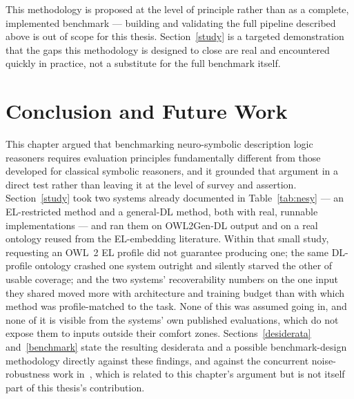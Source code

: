 This methodology is proposed at the level of principle rather than as a complete, implemented benchmark — building and validating the full pipeline described above is out of scope for this thesis. Section~\ref{study} is a targeted demonstration that the gaps this methodology is designed to close are real and encountered quickly in practice, not a substitute for the full benchmark itself.

\section{Conclusion and Future Work}
\label{conclusion}

This chapter argued that benchmarking neuro-symbolic description logic reasoners requires evaluation principles fundamentally different from those developed for classical symbolic reasoners, and it grounded that argument in a direct test rather than leaving it at the level of survey and assertion. Section~\ref{study} took two systems already documented in Table~\ref{tab:nesy} — an EL-restricted method and a general-DL method, both with real, runnable implementations — and ran them on OWL2Gen-DL output and on a real ontology reused from the EL-embedding literature. Within that small study, requesting an OWL~2 EL profile did not guarantee producing one; the same DL-profile ontology crashed one system outright and silently starved the other of usable coverage; and the two systems' recoverability numbers on the one input they shared moved more with architecture and training budget than with which method was profile-matched to the task. None of this was assumed going in, and none of it is visible from the systems' own published evaluations, which do not expose them to inputs outside their comfort zones. Sections~\ref{desiderata} and~\ref{benchmark} state the resulting desiderata and a possible benchmark-design methodology directly against these findings, and against the concurrent noise-robustness work in~\cite{loesch2024nsorn}, which is related to this chapter's argument but is not itself part of this thesis's contribution.

